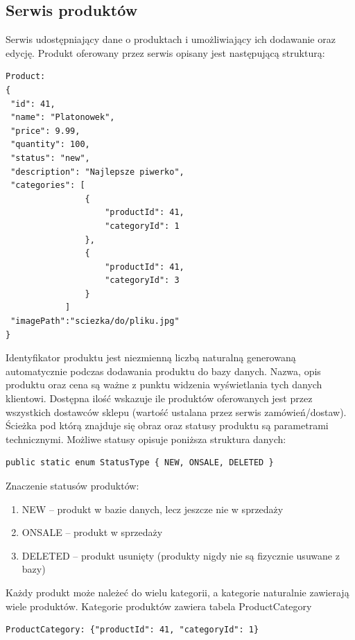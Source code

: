 \documentclass[11pt,a4paper,twoside]{article}
\begin{document}
\subsection{Serwis produktów}
Serwis udostępniający dane o produktach i umożliwiający ich dodawanie oraz edycję. Produkt oferowany przez serwis opisany jest następującą strukturą:

\begin{lstlisting}
Product:
{
 "id": 41,
 "name": "Platonowek",
 "price": 9.99,
 "quantity": 100,
 "status": "new",
 "description": "Najlepsze piwerko",
 "categories": [
                {
                    "productId": 41,
                    "categoryId": 1
                },
                {
                    "productId": 41,
                    "categoryId": 3
                }
            ]
 "imagePath":"sciezka/do/pliku.jpg"
}
\end{lstlisting}
\vspace{-20pt}
Identyfikator produktu jest niezmienną liczbą naturalną generowaną automatycznie podczas dodawania produktu do bazy danych. Nazwa, opis produktu oraz cena są ważne z punktu widzenia wyświetlania tych danych klientowi. Dostępna ilość wskazuje ile produktów oferowanych jest przez wszystkich dostawców sklepu (wartość ustalana przez serwis zamówień/dostaw). Ścieżka pod którą znajduje się obraz oraz statusy produktu są parametrami technicznymi. Możliwe statusy opisuje poniższa struktura danych:

\begin{lstlisting}
public static enum StatusType { NEW, ONSALE, DELETED }
\end{lstlisting}
\vspace{-20pt}
Znaczenie statusów produktów:
\begin{enumerate}
\item NEW -- produkt w bazie danych, lecz jeszcze nie w sprzedaży
\item ONSALE -- produkt w sprzedaży
\item DELETED -- produkt usunięty (produkty nigdy nie są fizycznie usuwane z bazy)
\end{enumerate}

Każdy produkt może należeć do wielu kategorii, a kategorie naturalnie zawierają wiele produktów. Kategorie produktów zawiera tabela ProductCategory

\begin{lstlisting}
ProductCategory: {"productId": 41, "categoryId": 1}
\end{lstlisting}
\vspace{-20pt}
\end{document}
